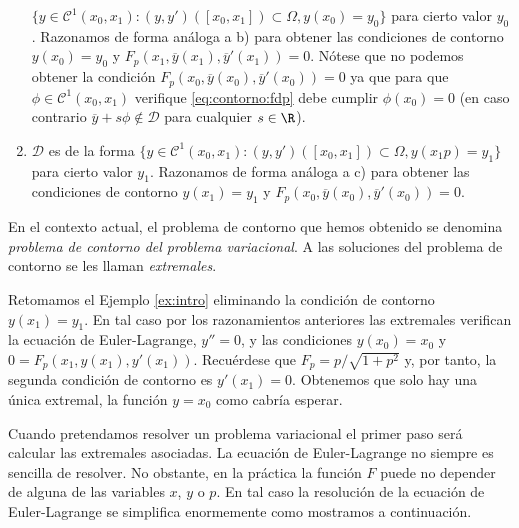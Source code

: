 \documentclass{article}
\begin{document}
\begin{enumerate}
  $\{y \in \mathcal{C}^1(x_0, x_1): (y, y')([x_0, x_1]) \subset \Omega, y(x_0) = y_0\}$ para cierto
  valor $y_0$. Razonamos de forma análoga a b) para obtener las condiciones de contorno
  $y(x_0) = y_0$ y $F_p(x_1, \overline{y}(x_1), \overline{y}'(x_1)) = 0$. Nótese que no podemos
  obtener la condición $F_p(x_0, \overline{y}(x_0), \overline{y}'(x_0)) = 0$ ya que para que
  $\phi \in \mathcal{C}^1(x_0,x_1)$ verifique \eqref{eq:contorno:fdp} debe cumplir $\phi(x_0) = 0$
  (en caso contrario $\overline{y}+s\phi \not \in \mathcal{D}$ para cualquier $s \in \R$).
\item $\mathcal{D}$ es de la forma
  $\{y \in \mathcal{C}^1(x_0, x_1): (y, y')([x_0, x_1]) \subset \Omega, y(x_1p) = y_1\}$ para cierto
  valor $y_1$. Razonamos de forma análoga a c) para obtener las condiciones de contorno
  $y(x_1) = y_1$ y $F_p(x_0, \overline{y}(x_0), \overline{y}'(x_0)) = 0$.
\end{enumerate}

\begin{definition}
  En el contexto actual, el problema de contorno que hemos obtenido se denomina \emph{problema de
    contorno del problema variacional}. A las soluciones del problema de contorno se les llaman
  \emph{extremales}.
\end{definition}

\begin{ex}
  Retomamos el Ejemplo \ref{ex:intro} eliminando la condición de contorno $y(x_1) = y_1$. En tal
  caso por los razonamientos anteriores las extremales verifican la ecuación de Euler-Lagrange,
  $y'' = 0$, y las condiciones $y(x_0) = x_0$ y $0 = F_p(x_1, y(x_1), y'(x_1))$. Recuérdese que
  $F_p = p / \sqrt{1+p^2}$ y, por tanto, la segunda condición de contorno es $y'(x_1) =
  0$. Obtenemos que solo hay una única extremal, la función $y = x_0$ como cabría esperar.
\end{ex}

Cuando pretendamos resolver un problema variacional el primer paso será calcular las extremales
asociadas. La ecuación de Euler-Lagrange no siempre es sencilla de resolver. No obstante, en la
práctica la función $F$ puede no depender de alguna de las variables $x$, $y$ o $p$. En tal caso la
resolución de la ecuación de Euler-Lagrange se simplifica enormemente como mostramos a continuación.
\end{document}
